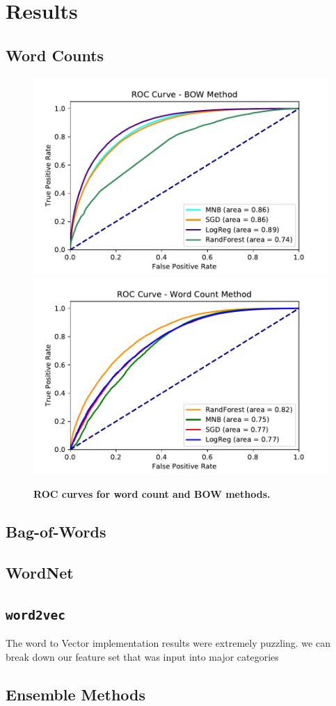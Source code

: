 \documentclass{article} %
\newcommand{\wordtvec}{\texttt{word2vec}}
\begin{document}
\section{Results}

\subsection{Word Counts} \label{sub:count_res}

\begin{figure}[]
	\centering
	\includegraphics[width=.49\textwidth]{roc}
	\includegraphics[width=.49\textwidth]{roc_wc}
	\caption{\textbf{ROC curves for word count and BOW methods.}}
	\label{roc_wc}
\end{figure}

\subsection{Bag-of-Words} \label{sub:bow_res}

\subsection{WordNet} \label{sub:wnet_res}

\subsection{\wordtvec}
The word to Vector implementation results were extremely puzzling. we can break down our feature set that was input into major categories
\subsection{Ensemble Methods}
\end{document}
